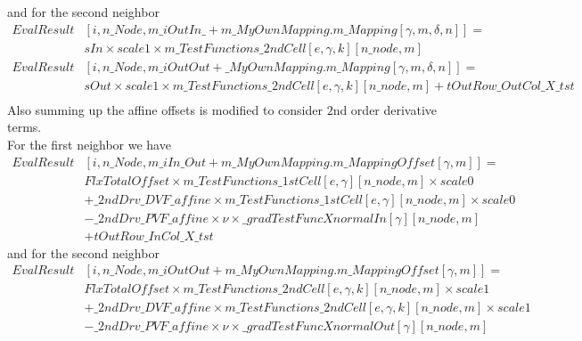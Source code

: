 \documentclass[BoSSSForSolvingConservationLaws.tex]{subfiles}
\begin{document}
and for the second neighbor
\begin{align*}
EvalResult&[i, n\_Node, m\_iOutIn\_ + m\_MyOwnMapping.m\_Mapping[\gamma, m, \delta, n]] = \\&sIn \times scale1 \times m\_TestFunctions\_2ndCell[e, \gamma, k][n\_node,m]\\
EvalResult&[i, n\_Node, m\_iOutOut + \_MyOwnMapping.m\_Mapping[\gamma, m, \delta, n]] = \\&sOut \times scale1 \times m\_TestFunctions\_2ndCell[e, \gamma, k][n\_node,m] + tOutRow\_OutCol\_X\_tst\\
\end{align*}
Also summing up the affine offsets is modified to consider $2$nd order derivative terms.\\
For the first neighbor we have
\begin{align*}
EvalResult&[i, n\_Node, m\_iIn\_Out + m\_MyOwnMapping.m\_MappingOffset[\gamma, m]] =\\
&FlxTotalOffset \times m\_TestFunctions\_1stCell[e, \gamma][n\_node,m] \times scale0\\
&+ \_2ndDrv\_DVF\_affine \times m\_TestFunctions\_1stCell[e, \gamma][n\_node,m] \times scale0\\
&- \_2ndDrv\_PVF\_affine \times \nu \times \_gradTestFuncXnormalIn[\gamma][n\_node,m]\\
&+tOutRow\_InCol\_X\_tst
\end{align*}
and for the second neighbor
\begin{align*}
EvalResult&[i, n\_Node, m\_iOutOut + m\_MyOwnMapping.m\_MappingOffset[\gamma, m]] =\\
&FlxTotalOffset \times m\_TestFunctions\_2ndCell[e, \gamma, k][n\_node,m] \times scale1 \\
&+ \_2ndDrv\_DVF\_affine \times m\_TestFunctions\_2ndCell[e, \gamma, k][n\_node,m] \times scale1\\
&- \_2ndDrv\_PVF\_affine \times \nu \times \_gradTestFuncXnormalOut[\gamma][n\_node,m]
\end{align*}
\end{document}
